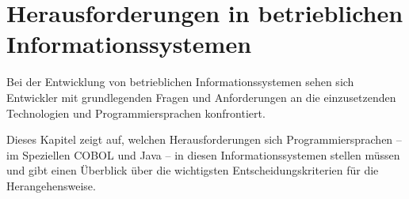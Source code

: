 \chapter{Herausforderungen in betrieblichen Informationssystemen}
Bei der Entwicklung von betrieblichen Informationssystemen sehen sich Entwickler mit grundlegenden Fragen und Anforderungen an die einzusetzenden Technologien und Programmiersprachen konfrontiert.

Dieses Kapitel zeigt auf, welchen Herausforderungen sich Programmiersprachen -- im Speziellen COBOL und Java -- in diesen Informationssystemen stellen müssen und gibt einen Überblick über die wichtigsten Entscheidungskriterien für die Herangehensweise.

\label{ch:herausforderungen}
    
    
    
    
    
    